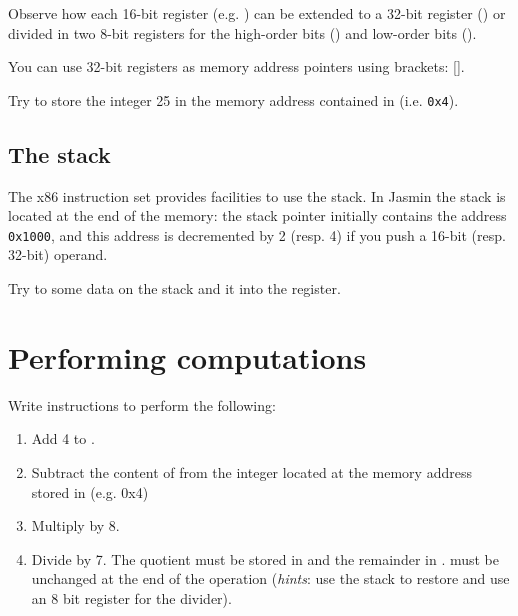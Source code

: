 \documentclass{../../tp}
\begin{document}
Observe how each 16-bit register (e.g. ) can be extended to a 32-bit register () or divided in two 8-bit registers for the high-order bits () and low-order bits (). 

You can use 32-bit registers as memory address pointers using brackets: []. 

\begin{instruction}
	Try to store the integer 25 in the memory address contained in  (i.e. \texttt{0x4}).
\end{instruction}


\subsection{The stack}

The x86 instruction set provides facilities to use the stack. In \textsf{Jasmin} the stack is located at the end of the memory: the stack pointer initially contains the address \texttt{0x1000}, and this address is decremented by 2 (resp. 4) if you push a 16-bit (resp. 32-bit) operand. 

\begin{instruction}
	Try to  some data on the stack and  it into the  register.
\end{instruction}


\section{Performing computations}


\begin{instruction}
	Write instructions to perform the following:
	\begin{enumerate}
		\item Add 4 to .
		\item Subtract the content of  from the integer located at the memory address stored in  (e.g. 0x4)
		\item Multiply  by 8.
		\item Divide  by 7. The quotient must be stored in  and the remainder in .
		 must be unchanged at the end of the operation 
		(\emph{hints}: use the stack to restore  and use an 8 bit register for the divider).
	\end{enumerate}
\end{instruction}
\end{document}
